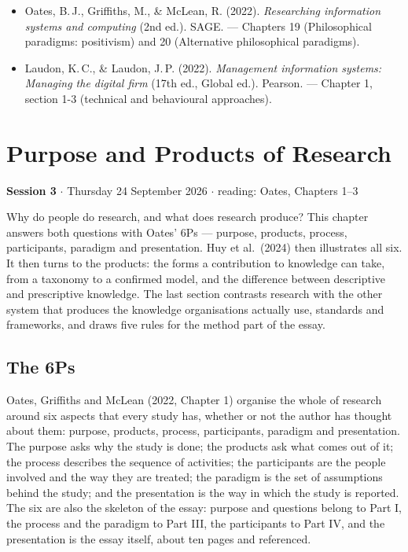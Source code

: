 \documentclass[11pt,a4paper,british,twoside=false,headings=small,chapterprefix=false,numbers=noenddot]{scrbook}
\newcommand{\sessionhead}[2]{\begin{tcolorbox}[enhanced, colback=uiamutedblue, colframe=uiamutedblue, arc=1.5pt, left=6pt, right=6pt]
  \small \textbf{Session #1} \;$\cdot$\; #2\end{tcolorbox}}
\begin{document}
\begin{itemize}
  \item Oates, B.\,J., Griffiths, M., \& McLean, R. (2022). \emph{Researching information systems and computing} (2nd ed.). SAGE. --- Chapters 19 (Philosophical paradigms: positivism) and 20 (Alternative philosophical paradigms).
  \item Laudon, K.\,C., \& Laudon, J.\,P. (2022). \emph{Management information systems: Managing the digital firm} (17th ed., Global ed.). Pearson. --- Chapter 1, section 1-3 (technical and behavioural approaches).
\end{itemize}

\chapter{Purpose and Products of Research}
\label{ch:3}
\sessionhead{3}{Thursday 24 September 2026 \;$\cdot$\; reading: Oates, Chapters 1--3}

Why do people do research, and what does research produce? This chapter answers both questions with Oates' 6Ps --- purpose, products, process, participants, paradigm and presentation. Huy et al.\ (2024) then illustrates all six. It then turns to the products: the forms a contribution to knowledge can take, from a taxonomy to a confirmed model, and the difference between descriptive and prescriptive knowledge. The last section contrasts research with the other system that produces the knowledge organisations actually use, standards and frameworks, and draws five rules for the method part of the essay.


\section{The 6Ps}

Oates, Griffiths and McLean (2022, Chapter 1) organise the whole of research around six aspects that every study has, whether or not the author has thought about them: purpose, products, process, participants, paradigm and presentation. The purpose asks why the study is done; the products ask what comes out of it; the process describes the sequence of activities; the participants are the people involved and the way they are treated; the paradigm is the set of assumptions behind the study; and the presentation is the way in which the study is reported. The six are also the skeleton of the essay: purpose and questions belong to Part I, the process and the paradigm to Part III, the participants to Part IV, and the presentation is the essay itself, about ten pages and referenced.
\end{document}
